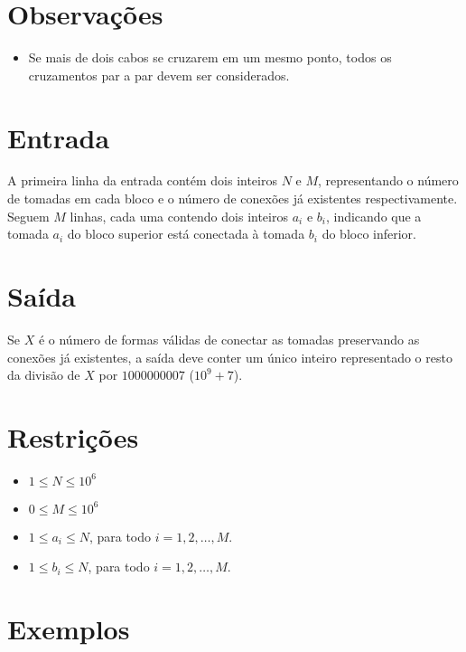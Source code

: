 \section*{Observações}
\begin{itemize}
\item Se mais de dois cabos se cruzarem em um mesmo ponto, todos os cruzamentos par a par devem ser considerados.
\end{itemize}
\section*{Entrada}

A primeira linha da entrada contém dois inteiros $N$ e $M$, representando o número de tomadas em cada bloco e o número de conexões já existentes respectivamente.
Seguem $M$ linhas, cada uma contendo dois inteiros $a_i$ e $b_i$, indicando que a tomada $a_i$ do bloco superior está conectada à tomada $b_i$ do bloco inferior.

\section*{Saída}

Se $X$ é o número de formas válidas de conectar as tomadas preservando as conexões já existentes, a saída deve conter um único inteiro representado o resto da divisão de $X$ por $1000000007$ ($10^9 + 7$).
 
\section*{Restrições}

\begin{itemize}
\item $1 \leq N \leq 10^6$
\item $0 \leq M \leq 10^6$
\item $1 \leq a_i \leq N$, para todo $i=1,2,\ldots,M$.
\item $1 \leq b_i \leq N$, para todo $i=1,2,\ldots,M$.
\end{itemize}
\section*{Exemplos}
\exemplo
